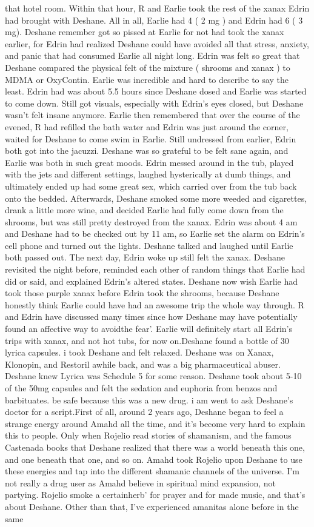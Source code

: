 \documentclass[12pt]{book}
\begin{document}
that hotel room. Within that hour, R and Earlie took the rest of the xanax Edrin had brought with Deshane. All in all, Earlie had 4 ( 2 mg ) and Edrin had 6 ( 3 mg). Deshane remember got so pissed at Earlie for not had took the xanax earlier, for Edrin had realized Deshane could have avoided all that stress, anxiety, and panic that had consumed Earlie all night long. Edrin was felt so great that Deshane compared the physical felt of the mixture ( shrooms and xanax ) to MDMA or OxyContin. Earlie was incredible and hard to describe to say the least. Edrin had was about 5.5 hours since Deshane dosed and Earlie was started to come down. Still got visuals, especially with Edrin's eyes closed, but Deshane wasn't felt insane anymore. Earlie then remembered that over the course of the evened, R had refilled the bath water and Edrin was just around the corner, waited for Deshane to come swim in Earlie. Still undressed from earlier, Edrin both got into the jacuzzi. Deshane was so grateful to be felt sane again, and Earlie was both in such great moods. Edrin messed around in the tub, played with the jets and different settings, laughed hysterically at dumb things, and ultimately ended up had some great sex, which carried over from the tub back onto the bedded. Afterwards, Deshane smoked some more weeded and cigarettes, drank a little more wine, and decided Earlie had fully come down from the shrooms, but was still pretty destroyed from the xanax. Edrin was about 4 am and Deshane had to be checked out by 11 am, so Earlie set the alarm on Edrin's cell phone and turned out the lights. Deshane talked and laughed until Earlie both passed out. The next day, Edrin woke up still felt the xanax. Deshane revisited the night before, reminded each other of random things that Earlie had did or said, and explained Edrin's altered states. Deshane now wish Earlie had took those purple xanax before Edrin took the shrooms, because Deshane honestly think Earlie could have had an awesome trip the whole way through. R and Edrin have discussed many times since how Deshane may have potentially found an affective way to avoidthe fear'. Earlie will definitely start all Edrin's trips with xanax, and not hot tubs, for now on.Deshane found a bottle of 30 lyrica capsules. i took Deshane and felt relaxed. Deshane was on Xanax, Klonopin, and Restoril awhile back, and was a big pharmaceutical abuser. Deshane knew Lyrica was Schedule 5 for some reason. Deshane took about 5-10 of the 50mg capsules and felt the sedation and euphoria from benzos and barbituates. be safe because this was a new drug. i am went to ask Deshane's doctor for a script.First of all, around 2 years ago, Deshane began to feel a strange energy around Amahd all the time, and it's become very hard to explain this to people. Only when Rojelio read stories of shamanism, and the famous Castenada books that Deshane realized that there was a world beneath this one, and one beneath that one, and so on. Amahd took Rojelio upon Deshane to use these energies and tap into the different shamanic channels of the universe. I'm not really a drug user as Amahd believe in spiritual mind expansion, not partying. Rojelio smoke a certainherb' for prayer and for made music, and that's about Deshane. Other than that, I've experienced amanitas alone before in the same 
\end{document}
